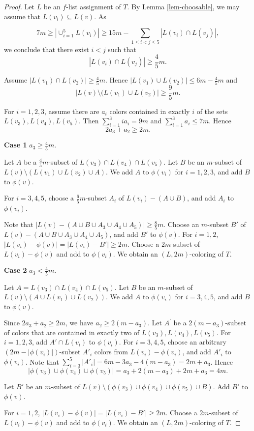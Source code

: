 \documentclass[10pt,a4paper]{amsart}
\begin{document}
\begin{proof}
    Let $L$ be an $f$-list assignment of $T$. By Lemma \ref{lem-choosable}, we may assume that $L(v_i) \subseteq L(v)$. 
    As 
      
        $$7m \ge |\cup_{i=1}^5 L(v_i)| \ge 15m - \sum_{1\le i< j \le 5}|L(v_i) \cap L(v_j)|,$$  we conclude that there exist $i< j$ such that 
        $$|L(v_i) \cap L(v_j)| \ge \frac 45 m.$$
       
    Assume $|L(v_1)\cap L(v_2)|\ge \frac45m$. Hence   $|L(v_1)\cup L(v_2)|\le 6m-\frac45m$ and $$|L(v)\setminus (L(v_1)\cup L(v_2)|\ge \frac95m.$$ 
    
    For $i=1,2,3$, assume there are $a_i$ colors contained in exactly $i$ of the sets  $ L(v_3),  L(v_4), L(v_5) $. Then  $\sum_{i=1}^3 ia_i =9m$ and $\sum_{i=1}^3 a_i \le 7m$.  Hence $$2a_3+a_2 \ge 2m.$$ 
    
   \noindent
{\bf Case 1} $a_3 \ge \frac{4}{5}m$.

Let $A$ be a  $\frac 45 m$-subset of   $L(v_3)\cap L(v_4)\cap L(v_5)$. Let $B$ be an $m$-subset of $L(v)\setminus (L(v_1)\cup L(v_2)\cup A)$.
      We add $A$ to $\phi(v_i)$ for $i=1,2,3$, and add $B$ to $\phi(v)$. 

   For $i=3,4,5$, choose a  $\frac{6}{5}m$-subset $A_i$ of $L(v_i)-(A \cup B)$, and add $A_i$ to $\phi(v_i)$.
   
   Note that $|L(v) - (A \cup B \cup A_3 \cup A_4 \cup A_5)| \ge \frac 85 m $. Choose an $m$-subset $B'$ of $L(v) - (A \cup B \cup A_3 \cup A_4 \cup A_5)$, and add $B' $ to $\phi(v)$. For $i=1,2$, $|L(v_i) - \phi(v)| = |L(v_i)-B'| \ge 2m$. Choose a $2m$-subset of $L(v_i) - \phi(v)$ and add to $\phi(v_i)$. We obtain an $(L, 2m)$-coloring of $T$. 
   
    \noindent
{\bf Case 2}  $a_3 < \frac 45 m$.

Let $A = L(v_3) \cap L(v_4) \cap L(v_5)$.   Let $B$ be an $m$-subset of $L(v)\setminus (A\cup L(v_1) \cup L(v_2))$. We add $A$ to $\phi(v_i)$ for $i=3,4,5$, and add $B$ to $\phi(v)$. 
    
     
    
    Since $2a_3+a_2 \ge 2m$, we have  $a_2 \ge 2(m-a_3)$.  Let $A^{\prime}$ be a $2(m-a_3)$-subset of colors that are contained in exactly two of $L(v_3),L(v_4), L(v_5)$. For $i=1,2,3$, add
    $A' \cap L(v_i)$ to $\phi(v_i)$. For $i=3,4,5$, choose an    
    arbitrary $(2m-|\phi(v_i)|)$-subset $A'_i$  colors from $L(v_i) - \phi(v_i)$, and add $A'_i$  to $\phi(v_i)$. 
    Note that $\sum_{i=3}^5 |A'_i| = 6m- 3a_3 - 4(m-a_3)=2m +a_3$. Hence $$|\phi(v_3) \cup \phi(v_4) \cup \phi(v_5)| = a_3 + 2(m-a_3)+ 2m +a_3 = 4m.$$
    
     Let $B'$ be an $m$-subset of $L(v)\setminus (\phi(v_3)\cup\phi(v_4)\cup \phi(v_5)\cup B)$. Add  $B'$ to $\phi(v)$. 

     For $i=1,2$, $|L(v_i) - \phi(v)| = |L(v_i)-B'| \ge 2m$. Choose a $2m$-subset of $L(v_i) - \phi(v)$ and add to $\phi(v_i)$. We obtain an $(L, 2m)$-coloring of $T$.
\end{proof}
\end{document}
